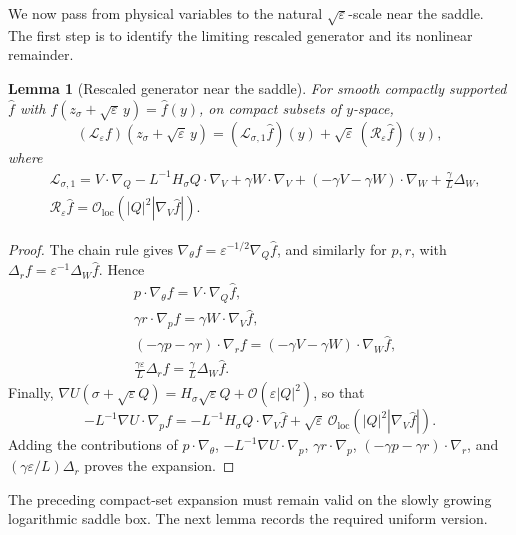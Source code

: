 \documentclass[11pt]{article}
\numberwithin{equation}{section}
\theoremstyle{plain}
\newtheorem{lemma}[theorem]{Lemma}
\theoremstyle{definition}
\theoremstyle{remark}
\newcommand{\eps}{\varepsilon}
\newcommand{\calL}{\mathcal L}
\newcommand{\loc}{\mathrm{loc}}
\begin{document}
We now pass from physical variables to the natural
$\sqrt\eps$-scale near the saddle.  The first step is to identify the limiting
rescaled generator and its nonlinear remainder.

\begin{lemma}[Rescaled generator near the saddle]
\label{lem:rescaled-generator-saddle}
For smooth compactly supported $\widehat f$ with
$f(z_\sigma+\sqrt\eps\,y)=\widehat f(y)$, on compact subsets of $y$-space,
\[
(\calL_\eps f)(z_\sigma+\sqrt\eps\,y)
=(\calL_{\sigma,1}\widehat f)(y)+\sqrt\eps\,(\mathcal R_\eps\widehat f)(y),
\]
where
\begin{align*}
&\calL_{\sigma,1}
=V\cdot\nabla_Q-L^{-1}H_\sigma Q\cdot\nabla_V+\gamma W\cdot\nabla_V
+(-\gamma V-\gamma W)\cdot\nabla_W+\frac{\gamma}{L}\Delta_W,
\\
&\mathcal R_\eps\widehat f=\mathcal O_{\loc}\left(|Q|^2|\nabla_V\widehat f|\right).
\end{align*}
\end{lemma}

\begin{proof}
The chain rule gives
$\nabla_\theta f=\eps^{-1/2}\nabla_Q\widehat f$, and similarly for $p,r$, with
$\Delta_r f=\eps^{-1}\Delta_W\widehat f$.  Hence
\begin{align*}
&p\cdot\nabla_\theta f=V\cdot\nabla_Q\widehat f,
\\
&\gamma r\cdot\nabla_p f=\gamma W\cdot\nabla_V\widehat f,
\\
&(-\gamma p-\gamma r)\cdot\nabla_r f=(-\gamma V-\gamma W)\cdot\nabla_W\widehat f,
\\
&\frac{\gamma\eps}{L}\Delta_r f=\frac{\gamma}{L}\Delta_W\widehat f.
\end{align*}
Finally, $\nabla U(\sigma+\sqrt\eps Q)=H_\sigma\sqrt\eps Q+\mathcal O(\eps|Q|^2)$, so that
\[
-L^{-1}\nabla U\cdot\nabla_p f=-L^{-1}H_\sigma Q\cdot\nabla_V\widehat f
+\sqrt\eps\,\mathcal O_{\loc}\left(|Q|^2|\nabla_V\widehat f|\right).
\]
Adding the contributions of
$p\cdot\nabla_\theta$,
$-L^{-1}\nabla U\cdot\nabla_p$,
$\gamma r\cdot\nabla_p$,
$(-\gamma p-\gamma r)\cdot\nabla_r$, and
$(\gamma\eps/L)\Delta_r$ proves the expansion.
\end{proof}

The preceding compact-set expansion must remain valid on the
slowly growing logarithmic saddle box.  The next lemma records the required
uniform version.
\end{document}
